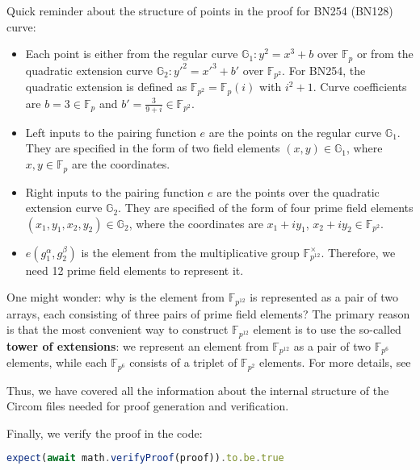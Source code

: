 \documentclass[../lecture-notes.tex]{subfiles}
\begin{document}
    Quick reminder about the structure of points in the proof for BN254 (BN128) curve:
    \begin{itemize}
        \item Each point is either from the regular curve $\mathbb{G}_1: y^2=x^3+b$ over $\mathbb{F}_p$ or from the quadratic extension curve $\mathbb{G}_2: y'^2=x'^3+b'$ over $\mathbb{F}_{p^2}$. For BN254, the quadratic extension is defined as $\mathbb{F}_{p^2} = \mathbb{F}_p(i)$ with $i^2+1$. Curve coefficients are $b=3 \in \mathbb{F}_p$ and $b'=\frac{3}{9+i} \in \mathbb{F}_{p^2}$.
        \item Left inputs to the pairing function $e$ are the points on the regular curve $\mathbb{G}_1$. They are specified in the form of two field elements $(x,y) \in \mathbb{G}_1$, where $x, y \in \mathbb{F}_p$ are the coordinates.
        \item Right inputs to the pairing function $e$ are the points over the quadratic extension curve $\mathbb{G}_2$. They are specified of the form of four prime field elements $(x_{1}, y_{1}, x_{2}, y_2) \in \mathbb{G}_2$, where the coordinates are $x_1+iy_1$, $x_2+iy_2 \in \mathbb{F}_{p^2}$.
        \item $e(g_1^{\alpha}, g_2^{\beta})$ is the element from the multiplicative group $\mathbb{F}_{p^{12}}^{\times}$. Therefore, we need 12 prime field elements to represent it.
    \end{itemize}

    \begin{remark}
        One might wonder: why is the element from $\mathbb{F}_{p^{12}}$ is represented as a pair of two arrays,
        each consisting of three pairs of prime field elements? The primary reason is that the most convenient
        way to construct $\mathbb{F}_{p^{12}}$ element is to use the so-called \textbf{tower of extensions}: we represent
        an element from $\mathbb{F}_{p^{12}}$ as a pair of two $\mathbb{F}_{p^6}$ elements, while each $\mathbb{F}_{p^6}$
        consists of a triplet of $\mathbb{F}_{p^2}$ elements. For more details, see 
    \end{remark}

    Thus, we have covered all the information about the internal structure of the Circom files needed for proof generation and verification.

    Finally, we verify the proof in the code:
    \begin{lstlisting}[language=TypeScript,numbers=none,basicstyle=\footnotesize\ttfamily\normalsize]
expect(await math.verifyProof(proof)).to.be.true
    \end{lstlisting}
\end{document}
